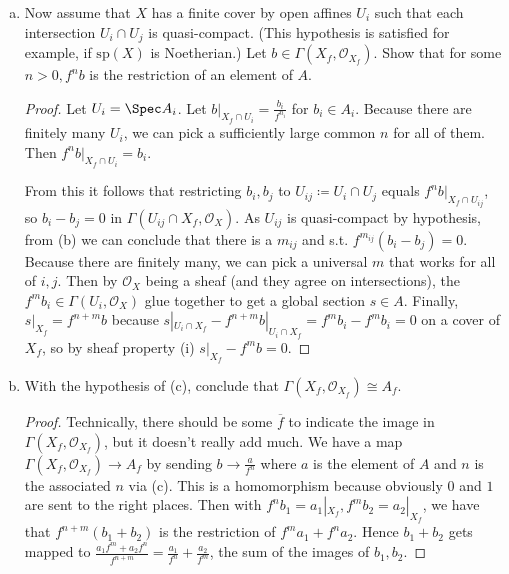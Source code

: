 \begin{exercise}
\begin{enumerate}[(a)]
\begin{proof}
		As $D(\overline{f}_i) \cong \Spec (A_i)_{\overline{f}_i }$, $a|_{X_f} = 0 \implies a|_{U_i} = 0 \in (A_i)_{\overline{f}_i}$.
		Thus $\exists n_i $ s.t. $\overline{f} _i^{n_i}a|_{U_i} = (f^{n_i}a)|_{U_i} = 0 $ in $A_i $ by definition of localizing.
		Because there are finitely many, we can take a common $n $ for all $\overline{f} _i $.
		As $\mathcal{O}_X $ is a sheaf, $f^na $ being 0 on the restictions to an open cover implies that $f^na $ is globally 0.
	\end{proof}
	\item Now assume that $X $ has a finite cover by open affines $U_i $ such that each intersection $U_i\cap U_j $ is quasi-compact. (This hypothesis is satisfied for example, if $\text{sp}(X)$ is Noetherian.) Let $b\in \Gamma(X_f,\mathcal{O}_{X_f}) $. Show that for some $n > 0, f^n b$ is the restriction of an element of $A $.
	\begin{proof}
		Let $U_i = \Spec A_i $.
		Let $b|_{X_f\cap U_i} = \frac{b_i}{f^{n_i} } $ for $b_i \in A_i $.
		Because there are finitely many $U_i $, we can pick a sufficiently large common $n $ for all of them.
		Then $f^nb|_{X_f\cap U_i} = b_i $.

		From this it follows that restricting $b_i,b_j $ to $U_{ij}\coloneqq U_i\cap U_j $ equals $f^nb|_{X_f\cap U_{ij}} $, so $b_i-b_j = 0 $ in $\Gamma(U_{ij}\cap X_f, \mathcal{O}_X) $.
		As $U_{ij} $ is quasi-compact by hypothesis, from (b) we can conclude that there is a $m_{ij} $ and s.t. $f^{m_{ij}}(b_i-b_j) = 0 $.
		Because there are finitely many, we can pick a universal $m $ that works for all of $i,j $.
		Then by $\mathcal{O}_X $ being a sheaf (and they agree on intersections), the $f^mb_i \in \Gamma(U_i,\mathcal{O}_X)$ glue together to get a global section $s \in A$.
		Finally, $s|_{X_f} = f^{n+m}b$ because $s|_{U_i\cap X_f}-f^{n+m}b|_{U_i\cap X_f} = f^mb_i-f^mb_i = 0 $ on a cover of $X_f $, so by sheaf property (i) $s|_{X_f}-f^mb = 0 $.
	\end{proof}
	\item With the hypothesis of (c), conclude that $\Gamma(X_f,\mathcal{O}_{X_f}) \cong A_f $.
	\begin{proof}
		Technically, there should be some $\overline{f}  $ to indicate the image in $\Gamma(X_f,\mathcal{O}_{X_f}) $, but it doesn't really add much.
		We have a map $\Gamma(X_f,\mathcal{O}_{X_f}) \to A_f $ by sending $b\to \frac{a}{f^n} $ where $a$ is the element of $A $ and $n $ is the associated $n $ via (c).
		This is a homomorphism because obviously 0 and $1 $ are sent to the right places.
		Then with $f^nb_{1} = a_{1}|_{X_f}, f^mb_{2} = a_{2}|_{X_f}$, we have that $f^{n+m}(b_{1}+b_{2})  $ is the restriction of $f^ma_{1}+f^na_2 $.
		Hence $b_{1}+b_{2} $ gets mapped to $\frac{a_{1}f^m + a_{2}f^n}{f^{n+m} } = \frac{a_{1}}{f^n} +\frac{a_{2}}{f^m}$, the sum of the images of $b_{1},b_{2} $.


\end{proof}
\end{enumerate}
\end{exercise}
